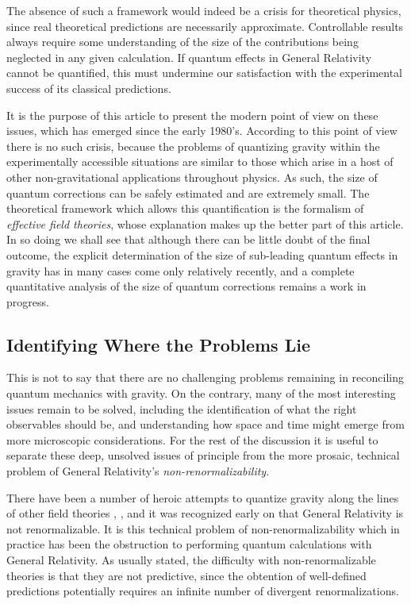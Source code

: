 \documentclass[12pt]{article}
\begin{document}
The absence of such a framework would indeed be a crisis for
theoretical physics, since real theoretical predictions are
necessarily approximate. Controllable results always require some
understanding of the size of the contributions being neglected in
any given calculation. If quantum effects in General Relativity
cannot be quantified, this must undermine our satisfaction with
the experimental success of its classical predictions.

It is the purpose of this article to present the modern point of
view on these issues, which has emerged since the early 1980's.
According to this point of view there is no such crisis, because
the problems of quantizing gravity within the experimentally
accessible situations are similar to those which arise in a host
of other non-gravitational applications throughout physics. As
such, the size of quantum corrections can be safely estimated and
are extremely small. The theoretical framework which allows this
quantification is the formalism of \emph{effective field
theories}, whose explanation makes up the better part of this
article. In so doing we shall see that although there can be
little doubt of the final outcome, the explicit determination of
the size of sub-leading quantum effects in gravity has in many
cases come only relatively recently, and a complete quantitative
analysis of the size of quantum corrections remains a work in
progress.

\subsection{Identifying Where the Problems Lie}
%
This is not to say that there are no challenging problems
remaining in reconciling quantum mechanics with gravity. On the
contrary, many of the most interesting issues remain to be solved,
including the identification of what the right observables should
be, and understanding how space and time might emerge from more
microscopic considerations. For the rest of the discussion it is
useful to separate these deep, unsolved issues of principle from
the more prosaic, technical problem of General Relativity's
\emph{non-renormalizability}.

There have been a number of heroic attempts to quantize gravity
along the lines of other field theories \cite{EarlyQG},
\cite{CanonQG}, \cite{LivRev-QG} and it was recognized early on
that General Relativity is not renormalizable. It is this
technical problem of non-renormalizability which in practice has
been the obstruction to performing quantum calculations with
General Relativity. As usually stated, the difficulty with
non-renormalizable theories is that they are not predictive, since
the obtention of well-defined predictions potentially requires an
infinite number of divergent renormalizations.
\end{document}

